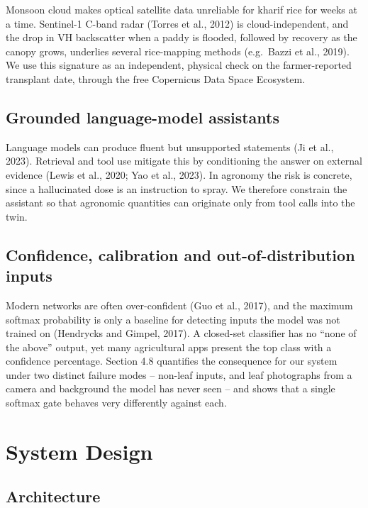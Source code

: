 \documentclass[11pt,a4paper]{article}
\begin{document}
Monsoon cloud makes optical satellite data unreliable for kharif rice for weeks at a time. Sentinel-1 C-band radar (Torres et al., 2012) is cloud-independent, and the drop in VH backscatter when a paddy is flooded, followed by recovery as the canopy grows, underlies several rice-mapping methods (e.g.\ Bazzi et al., 2019). We use this signature as an independent, physical check on the farmer-reported transplant date, through the free Copernicus Data Space Ecosystem.

\subsection{Grounded language-model assistants}

Language models can produce fluent but unsupported statements (Ji et al., 2023). Retrieval and tool use mitigate this by conditioning the answer on external evidence (Lewis et al., 2020; Yao et al., 2023). In agronomy the risk is concrete, since a hallucinated dose is an instruction to spray. We therefore constrain the assistant so that agronomic quantities can originate only from tool calls into the twin.

\subsection{Confidence, calibration and out-of-distribution inputs}

Modern networks are often over-confident (Guo et al., 2017), and the maximum softmax probability is only a baseline for detecting inputs the model was not trained on (Hendrycks and Gimpel, 2017). A closed-set classifier has no ``none of the above'' output, yet many agricultural apps present the top class with a confidence percentage. Section 4.8 quantifies the consequence for our system under two distinct failure modes -- non-leaf inputs, and leaf photographs from a camera and background the model has never seen -- and shows that a single softmax gate behaves very differently against each.

\section{System Design}

\subsection{Architecture}
\end{document}
